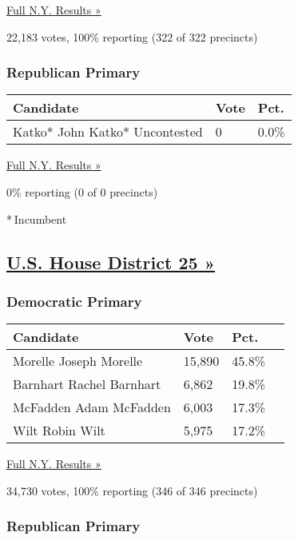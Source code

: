 \href{https://www.nytimes3xbfgragh.onion/elections/results/new-york}{Full
N.Y. Results »}

22,183 votes, 100\% reporting (322 of 322 precincts)

\hypertarget{republican-primary-18}{%
\subsubsection{Republican Primary}\label{republican-primary-18}}

\begin{longtable}[]{@{}lll@{}}
\toprule
Candidate & Vote & Pct.\tabularnewline
\midrule
\endhead
 Katko* John Katko* Uncontested & 0 & 0.0\%\tabularnewline
\bottomrule
\end{longtable}

\href{https://www.nytimes3xbfgragh.onion/elections/results/new-york}{Full
N.Y. Results »}

0\% reporting (0 of 0 precincts)

* Incumbent

\hypertarget{us-house-district-25-}{%
\subsection{\texorpdfstring{\href{https://www.nytimes3xbfgragh.onion/elections/results/new-york-house-district-25-primary-election}{U.S.
House District 25
»}}{U.S. House District 25 »}}\label{us-house-district-25-}}

\hypertarget{democratic-primary-25}{%
\subsubsection{Democratic Primary}\label{democratic-primary-25}}

\begin{longtable}[]{@{}llll@{}}
\toprule
Candidate & Vote & Pct. &\tabularnewline
\midrule
\endhead
 Morelle Joseph Morelle & 15,890 & 45.8\% &\tabularnewline
 Barnhart Rachel Barnhart & 6,862 & 19.8\% &\tabularnewline
 McFadden Adam McFadden & 6,003 & 17.3\% &\tabularnewline
 Wilt Robin Wilt & 5,975 & 17.2\% &\tabularnewline
\bottomrule
\end{longtable}

\href{https://www.nytimes3xbfgragh.onion/elections/results/new-york}{Full
N.Y. Results »}

34,730 votes, 100\% reporting (346 of 346 precincts)

\hypertarget{republican-primary-19}{%
\subsubsection{Republican Primary}\label{republican-primary-19}}

